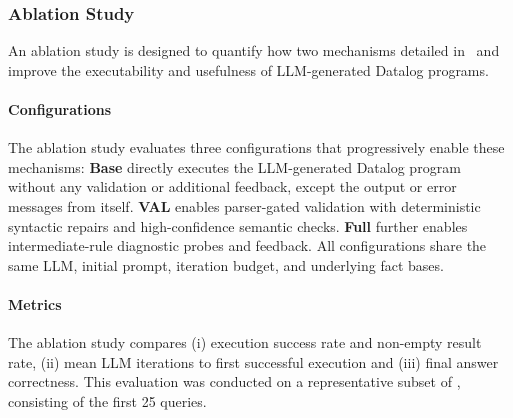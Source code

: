 \subsubsection{Ablation Study}\label{sec:ablation-dataloc}
An ablation study is designed to quantify how two mechanisms detailed in~ and  improve the executability and usefulness of LLM-generated Datalog programs.

\paragraph{Configurations}
The ablation study evaluates three configurations that progressively enable these mechanisms:
\textbf{Base} directly executes the LLM-generated Datalog program without any validation or additional feedback, except the output or error messages from \souffle{} itself. \textbf{VAL} enables parser-gated validation with deterministic syntactic repairs and high-confidence semantic checks. \textbf{Full} further enables intermediate-rule diagnostic probes and feedback.
All configurations share the same LLM, initial prompt, iteration budget, and underlying fact bases.

\paragraph{Metrics}
The ablation study compares (i) execution success rate and non-empty result rate, (ii) mean LLM iterations to first successful execution and (iii) final answer correctness. This evaluation was conducted on a representative subset of \dataset, consisting of the first 25 queries.

